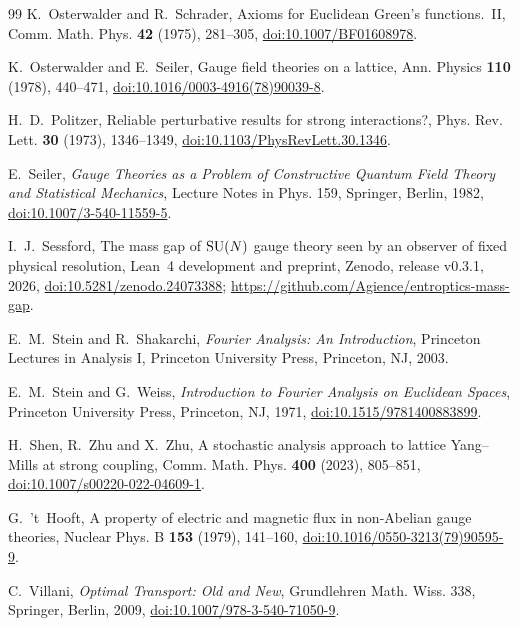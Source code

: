 \begin{thebibliography}{99}
K.~Osterwalder and R.~Schrader, Axioms for Euclidean Green's functions.~II,
Comm. Math. Phys. \textbf{42} (1975), 281--305,
\href{https://doi.org/10.1007/BF01608978}{doi:10.1007/BF01608978}.

K.~Osterwalder and E.~Seiler, Gauge field theories on a lattice, Ann. Physics
\textbf{110} (1978), 440--471,
\href{https://doi.org/10.1016/0003-4916(78)90039-8}{doi:10.1016/0003-4916(78)90039-8}.

H.~D.~Politzer, Reliable perturbative results for strong interactions?, Phys. Rev. Lett. \textbf{30} (1973), 1346--1349, \href{https://doi.org/10.1103/PhysRevLett.30.1346}{doi:10.1103/PhysRevLett.30.1346}.

E.~Seiler, \emph{Gauge Theories as a Problem of Constructive Quantum Field
Theory and Statistical Mechanics}, Lecture Notes in Phys. 159, Springer,
Berlin, 1982, \href{https://doi.org/10.1007/3-540-11559-5}{doi:10.1007/3-540-11559-5}.

I.~J.~Sessford, The mass gap of $\mathrm{SU}(N)$ gauge theory seen by an observer of
fixed physical resolution, Lean~4 development and preprint, Zenodo, release
v0.3.1, 2026,
\href{https://doi.org/10.5281/zenodo.24073388}{doi:10.5281/zenodo.24073388};
\url{https://github.com/Agience/entroptics-mass-gap}.

E.~M.~Stein and R.~Shakarchi, \emph{Fourier Analysis: An Introduction}, Princeton Lectures in Analysis I, Princeton University Press, Princeton, NJ, 2003.

E.~M.~Stein and G.~Weiss, \emph{Introduction to Fourier Analysis on Euclidean Spaces}, Princeton University Press, Princeton, NJ, 1971, \href{https://doi.org/10.1515/9781400883899}{doi:10.1515/9781400883899}.

H.~Shen, R.~Zhu and X.~Zhu, A stochastic analysis approach to lattice
Yang--Mills at strong coupling, Comm. Math. Phys. \textbf{400} (2023),
805--851, \href{https://doi.org/10.1007/s00220-022-04609-1}{doi:10.1007/s00220-022-04609-1}.

G.~'t~Hooft, A property of electric and magnetic flux in non-Abelian gauge theories, Nuclear Phys. B \textbf{153} (1979), 141--160, \href{https://doi.org/10.1016/0550-3213(79)90595-9}{doi:10.1016/0550-3213(79)90595-9}.

C.~Villani, \emph{Optimal Transport: Old and New}, Grundlehren Math. Wiss.
338, Springer, Berlin, 2009,
\href{https://doi.org/10.1007/978-3-540-71050-9}{doi:10.1007/978-3-540-71050-9}.


\end{thebibliography}
